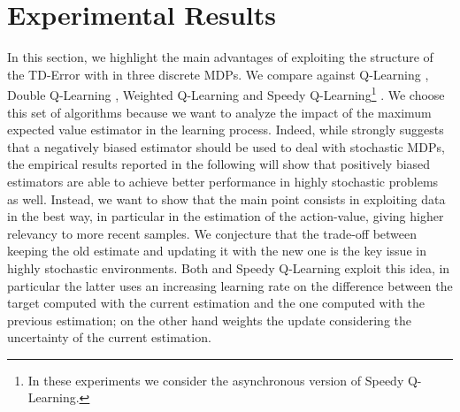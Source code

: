 \documentclass[conference]{IEEEtran}
\begin{document}
\section{Experimental Results}\label{S:empirical}
In this section, we highlight the main advantages of exploiting the structure of the TD-Error with \alg in three discrete MDPs. We compare \alg against Q-Learning \cite{watkins1992q}, Double Q-Learning \cite{van2010double}, Weighted Q-Learning \cite{d2016estimating} and Speedy Q-Learning\footnote{In these experiments we consider the asynchronous version of Speedy Q-Learning.} \cite{NIPS2011_4251}. We choose this set of algorithms because we want to analyze the impact of the maximum expected value estimator in the learning process. Indeed, while \cite{van2010double} strongly suggests that a negatively biased estimator should be used to deal with stochastic MDPs, the  empirical results reported in the following will show that positively biased estimators are able to achieve better performance in highly stochastic problems as well. Instead, we want to show that the main point consists in exploiting data in the best way, in particular in the estimation of the action-value, giving higher relevancy to more recent samples. We conjecture that the trade-off between keeping the old estimate and updating it with the new one is the key issue in highly stochastic environments. Both \alg and Speedy Q-Learning exploit this idea, in particular the latter uses an increasing learning rate on the difference between the target computed with the current estimation and the one computed with the previous estimation; on the other hand \alg weights the update considering the uncertainty of the current estimation.
\end{document}
